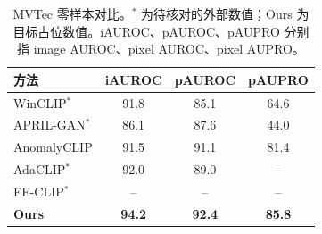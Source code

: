\begin{table}[t]
\centering
\caption{MVTec 零样本对比。$^{*}$ 为待核对的外部数值；Ours 为目标占位数值。iAUROC、pAUROC、pAUPRO 分别指 image AUROC、pixel AUROC、pixel AUPRO。}
\label{tab:sota}
\small
\setlength{\tabcolsep}{4.5pt}
\begin{tabular}{lccc}
\toprule
方法 & iAUROC & pAUROC & pAUPRO \\
\midrule
WinCLIP$^{*}$    & 91.8 & 85.1 & 64.6 \\
APRIL-GAN$^{*}$  & 86.1 & 87.6 & 44.0 \\
AnomalyCLIP      & 91.5 & 91.1 & 81.4 \\
AdaCLIP$^{*}$    & 92.0 & 89.0 & --   \\
FE-CLIP$^{*}$    & --   & --   & --   \\
\midrule
\textbf{Ours}    & \textbf{94.2} & \textbf{92.4} & \textbf{85.8} \\
\bottomrule
\end{tabular}
\end{table}
